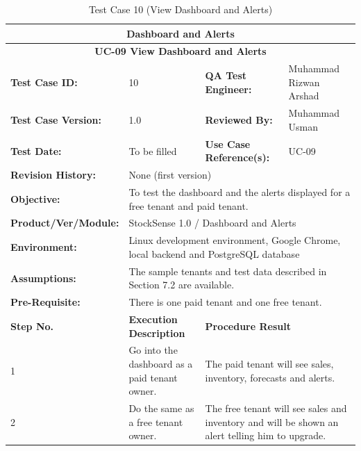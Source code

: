 \documentclass{StockSense}
\begin{document}
\begin{table}[!htbp]
\centering
\caption{Test Case 10 (View Dashboard and Alerts)}
{\small\linespread{1}\selectfont
\begin{tabular}{|p{}|p{}|p{}|p{}|}
\hline
\multicolumn{4}{|c|}{\textbf{Dashboard and Alerts}} \\ \hline
\multicolumn{4}{|c|}{\textbf{UC-09 View Dashboard and Alerts}} \\ \hline
\textbf{Test Case ID:} & 10 & \textbf{QA Test Engineer:} & Muhammad Rizwan Arshad \\ \hline
\textbf{Test Case Version:} & 1.0 & \textbf{Reviewed By:} & Muhammad Usman \\ \hline
\textbf{Test Date:} & To be filled & \textbf{Use Case Reference(s):} & UC-09 \\ \hline
\textbf{Revision History:} & \multicolumn{3}{p{\dimexpr0.70\textwidth+4\tabcolsep\relax}|}{None (first version)} \\ \hline
\textbf{Objective:} & \multicolumn{3}{p{\dimexpr0.70\textwidth+4\tabcolsep\relax}|}{To test the dashboard and the alerts displayed for a free tenant and paid tenant.} \\ \hline
\textbf{Product/Ver/Module:} & \multicolumn{3}{p{\dimexpr0.70\textwidth+4\tabcolsep\relax}|}{StockSense 1.0 / Dashboard and Alerts} \\ \hline
\textbf{Environment:} & \multicolumn{3}{p{\dimexpr0.70\textwidth+4\tabcolsep\relax}|}{Linux development environment, Google Chrome, local backend and PostgreSQL database} \\ \hline
\textbf{Assumptions:} & \multicolumn{3}{p{\dimexpr0.70\textwidth+4\tabcolsep\relax}|}{The sample tenants and test data described in Section 7.2 are available.} \\ \hline
\textbf{Pre-Requisite:} & \multicolumn{3}{p{\dimexpr0.70\textwidth+4\tabcolsep\relax}|}{There is one paid tenant and one free tenant.} \\ \hline
\textbf{Step No.} & \textbf{Execution Description} & \multicolumn{2}{l|}{\textbf{Procedure Result}} \\ \hline
1 & Go into the dashboard as a paid tenant owner. & \multicolumn{2}{p{\dimexpr0.42\textwidth+2\tabcolsep\relax}|}{The paid tenant will see sales, inventory, forecasts and alerts.} \\ \hline
2 & Do the same as a free tenant owner. & \multicolumn{2}{p{\dimexpr0.42\textwidth+2\tabcolsep\relax}|}{The free tenant will see sales and inventory and will be shown an alert telling him to upgrade.} \\ \hline

\end{tabular}}
\end{table}
\end{document}
